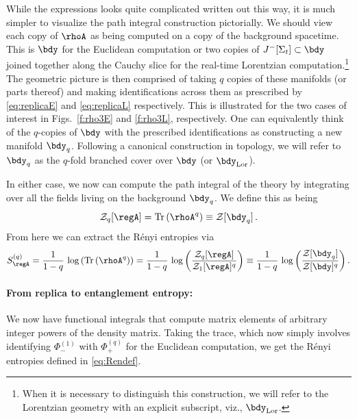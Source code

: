\documentclass[12pt,openany]{book}
\begin{document}
While the expressions looks quite complicated written out this way, it  is much simpler to visualize the path integral construction pictorially. We should view each copy of $\rhoA$ as being computed on a copy of the background spacetime. This is $\bdy $ for the Euclidean computation or two copies of $J^-[\Sigma_t] \subset \bdy$ joined together along the Cauchy slice for the real-time Lorentzian computation.\footnote{ When it is necessary to distinguish this construction, we will refer to the Lorentzian geometry with an explicit subscript, viz., $\bdy_\text{Lor}$.}
The geometric picture is then comprised of taking $q$ copies of these manifolds (or parts thereof) and making identifications across them as prescribed by \eqref{eq:replicaE}  and \eqref{eq:replicaL} respectively. This is illustrated for the two cases of interest in Figs.~\ref{f:rho3E} and \ref{f:rho3L}, respectively. One can equivalently think of the $q$-copies of $\bdy$ with the prescribed identifications as constructing a new manifold $\bdy_q$. Following a canonical construction in topology, we will refer to $\bdy_q$ as the $q$-fold branched cover over $\bdy$ (or $\bdy_\text{Lor}$).

In either case, we now can compute the path integral of the theory by integrating over all the fields living on the background $\bdy_q$. We define this as being
%
\begin{equation}
\mathcal{Z}_q[\regA] = {\rm Tr}\left( \rhoA^q\right) \equiv \mathcal{Z}[\bdy_q] \,.
\label{eq:zqdef}
\end{equation}
%
From here we can extract the R\'enyi entropies via
%
\begin{equation}
S_\regA^{(q)} = \frac{1}{1-q}\, \log\left({\rm Tr}\left( \rhoA^q\right) \right)=
\frac{1}{1-q} \,\log  \left(\frac{\mathcal{Z}_q[\regA] }{\mathcal{Z}_1[\regA]^q }\right)
\equiv \frac{1}{1-q} \, \log\left(\frac{\mathcal{Z}[\bdy_q]}{\mathcal{Z}[\bdy]^q}\right) .
\label{eq:sqZ}
\end{equation}
%

\paragraph{From replica to entanglement entropy:} We now have functional integrals that compute matrix elements of arbitrary integer powers of the density matrix. Taking the trace, which now simply involves identifying $\Phi^{(1)}_-$ with $\Phi^{(q)}_+$ for the Euclidean computation, we get the R\'enyi entropies defined in \eqref{eq:Rendef}.
\end{document}
